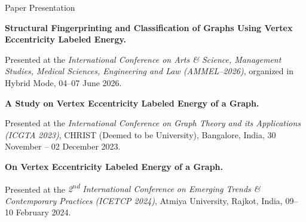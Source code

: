 \begin{rubric}{Paper Presentation}

\entry*[Jun 2026]%
    \textbf{Structural Fingerprinting and Classification of Graphs Using Vertex Eccentricity Labeled Energy.}\par
    Presented at the \emph{International Conference on Arts \& Science, Management Studies, Medical Sciences, Engineering and Law (AMMEL--2026)}, organized in Hybrid Mode, 04--07 June 2026.

%
    \textbf{A Study on Vertex Eccentricity Labeled Energy of a Graph.}\par
    Presented at the \emph{International Conference on Graph Theory and its Applications (ICGTA 2023)}, CHRIST (Deemed to be University), Bangalore, India, 30 November -- 02 December 2023.

\entry*[Feb 2024]%
    \textbf{On Vertex Eccentricity Labeled Energy of a Graph.}\par
    Presented at the \emph{2\textsuperscript{nd} International Conference on Emerging Trends \& Contemporary Practices (ICETCP 2024)}, Atmiya University, Rajkot, India, 09--10 February 2024.
\end{rubric}
